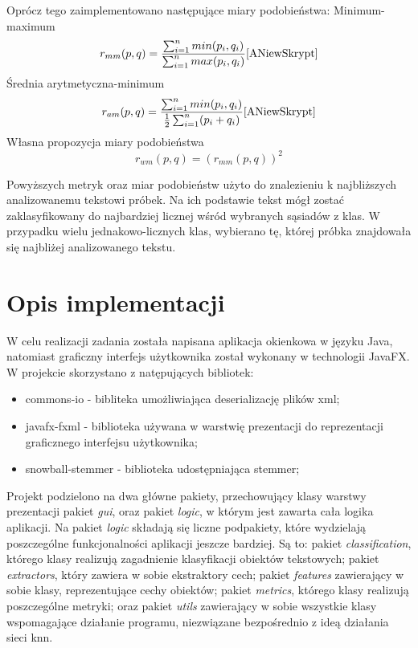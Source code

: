 \documentclass{classrep}
\begin{document}
Oprócz tego zaimplementowano następujące miary podobieństwa: \newline
Minimum-maximum
\begin{equation}
r_{mm}(p,q) = \frac{\sum_{i=1}^{n}min(p_{i},q_{i})}{\sum_{i=1}^{n}max(p_{i},q_{i})} \cite{ANiewSkrypt}
\end{equation}
Średnia arytmetyczna-minimum
\begin{equation}
r_{am}(p,q) = \frac{\sum_{i=1}^{n}min(p_{i},q_{i})}{\frac{1}{2}\sum_{i=1}^{n}(p_{i}+q_{i})} \cite{ANiewSkrypt}
\end{equation}
Własna propozycja miary podobieństwa
\begin{equation}
r_{wm}(p,q) = (r_{mm}(p,q))^{2}
\end{equation}

Powyższych metryk oraz miar podobieństw użyto do znalezieniu k najbliższych analizowanemu tekstowi próbek. Na ich podstawie tekst mógł zostać zaklasyfikowany do najbardziej licznej wśród wybranych sąsiadów z klas. W przypadku wielu jednakowo-licznych klas, wybierano tę, której próbka znajdowała się najbliżej analizowanego tekstu.

\section{Opis implementacji}

W celu realizacji zadania została napisana aplikacja okienkowa w języku Java, natomiast graficzny interfejs użytkownika został wykonany w technologii JavaFX.
W projekcie skorzystano z natępujących bibliotek:
\begin{itemize}
	\item commons-io - bibliteka umożliwiająca deserializację plików xml; \cite{commons-io}
	\item javafx-fxml - biblioteka używana w warstwię prezentacji do reprezentacji graficznego interfejsu użytkownika; \cite{JavaFX}
	\item snowball-stemmer - biblioteka udostępniająca stemmer; \cite{Stemmer}
\end{itemize}

Projekt podzielono na dwa główne pakiety, przechowujący klasy warstwy prezentacji pakiet \textit{gui}, oraz pakiet \textit{logic}, w którym jest zawarta cała logika aplikacji. Na pakiet \textit{logic} składają się liczne podpakiety, które wydzielają poszczególne funkcjonalności aplikacji jeszcze bardziej. Są to: pakiet \textit{classification}, którego klasy realizują zagadnienie klasyfikacji obiektów tekstowych; pakiet \textit{extractors}, który zawiera w sobie ekstraktory cech; pakiet \textit{features} zawierający w sobie klasy, reprezentujące cechy obiektów; pakiet \textit{metrics}, którego klasy realizują poszczególne metryki; oraz pakiet \textit{utils} zawierający w sobie wszystkie klasy wspomagające działanie programu, niezwiązane bezpośrednio z ideą działania sieci knn.
\end{document}
